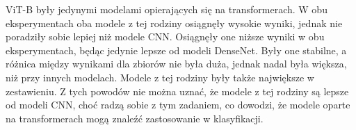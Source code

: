 ViT-B były jedynymi modelami opierających się na transformerach. W obu eksperymentach oba modele z tej rodziny osiągnęły wysokie wyniki, jednak nie poradziły sobie lepiej niż modele CNN. Osiągnęły one niższe wyniki w obu eksperymentach, będąc jedynie lepsze od modeli DenseNet. Były one stabilne, a różnica między wynikami dla zbiorów nie była duża, jednak nadal była większa, niż przy innych modelach. Modele z tej rodziny były także największe w zestawieniu.  Z tych powodów nie można uznać, że modele z tej rodziny są lepsze od modeli CNN, choć radzą sobie z tym zadaniem, co dowodzi, że modele oparte na transformerach mogą znaleźć zastosowanie w klasyfikacji. 


\clearpage